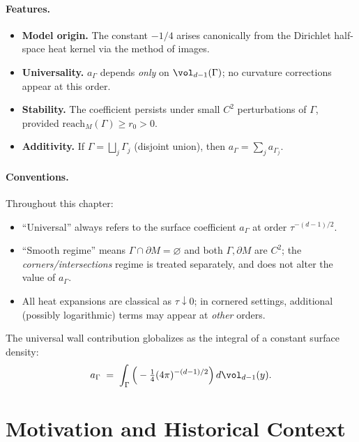 \paragraph{Features.}
\begin{itemize}
  \item \textbf{Model origin.} The constant $-1/4$ arises canonically from the Dirichlet half-space heat kernel via the method of images.
  \item \textbf{Universality.} $a_\Gamma$ depends \emph{only} on $\vol_{d-1}(\Gamma)$; no curvature corrections appear at this order.
  \item \textbf{Stability.} The coefficient persists under small $C^2$ perturbations of $\Gamma$, provided $\mathrm{reach}_M(\Gamma)\ge r_0>0$.
  \item \textbf{Additivity.} If $\Gamma=\bigsqcup_{j} \Gamma_j$ (disjoint union), then $a_\Gamma=\sum_j a_{\Gamma_j}$.
\end{itemize}

\paragraph{Conventions.}
Throughout this chapter:
\begin{itemize}
  \item “Universal” always refers to the surface coefficient $a_\Gamma$ at order $\tau^{-(d-1)/2}$.
  \item “Smooth regime” means $\Gamma\cap\partial M=\varnothing$ and both $\Gamma,\partial M$ are $C^2$; the \emph{corners/intersections} regime is treated separately, and does not alter the value of $a_\Gamma$.
  \item All heat expansions are classical as $\tau\downarrow 0$; in cornered settings, additional (possibly logarithmic) terms may appear at \emph{other} orders.
\end{itemize}

\begin{remark}\label{rem:aglobal}
The universal wall contribution globalizes as the integral of a constant surface density:
\begin{equation}\label{eq:aGamma-global}
a_\Gamma \;=\; \int_{\Gamma} \Big(-\tfrac14(4\pi)^{-(d-1)/2}\Big)\, d\vol_{d-1}(y).
\end{equation}
\end{remark}

\section{Motivation and Historical Context}
\label{sec:motivation}

